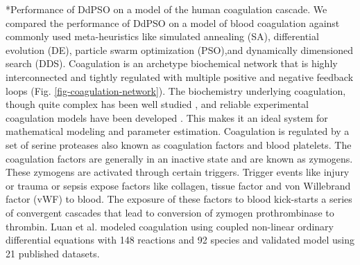 \documentclass[12pt]{article}
\makeatletter
\renewcommand\subsection{\@startsection
	{subsection}{2}{0mm}
	{-0.05in}
	{-0.5\baselineskip}
	{\normalfont\normalsize\bfseries}}
\makeatother
\begin{document}
\subsection*{Performance of DdPSO on a model of the human coagulation cascade.}
We compared the performance of DdPSO on a model of blood coagulation against commonly used meta-heuristics like simulated annealing (SA), differential evolution (DE), particle swarm optimization (PSO),and dynamically dimensioned search (DDS). Coagulation is an archetype biochemical network that is highly interconnected and tightly regulated with multiple positive and negative feedback loops (Fig. \ref{fig-coagulation-network}). The biochemistry underlying coagulation, though quite complex has been well studied \cite{mann2003dynamics,mann2003all,mann2003thrombin,vogler2009contact,diamond2013systems,fogelson2005coagulation,anand2003model}, and reliable experimental coagulation models have been developed \cite{hockin2002model,chatterjee2010systems,mann2006models,luan2007computationally}. This makes it an ideal system for mathematical modeling and parameter estimation. Coagulation is regulated by a set of serine proteases also known as coagulation factors and blood platelets. The coagulation factors are generally in an inactive state and are known as zymogens. These zymogens are activated through certain triggers. Trigger events like injury or trauma or sepsis expose factors like collagen, tissue factor and von Willebrand factor (vWF) to blood. The exposure of these factors to blood kick-starts a series of convergent cascades that lead to conversion of zymogen prothrombinase to thrombin.   Luan et al. modeled coagulation using coupled non-linear ordinary differential equations with 148 reactions and 92 species \cite{luan2007computationally} and validated model using 21 published datasets.
\end{document}
